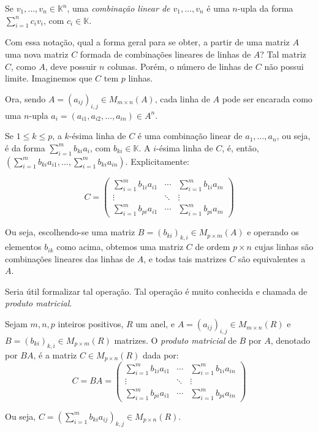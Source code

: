 \begin{definition}
    Se $v_1, \dots, v_n\in \mathbb K^n$, uma \emph{combinação linear de $v_1, \dots, v_n$} é uma $n$-upla da forma $\sum_{i=1}^n c_i v_i$, com $c_i\in \mathbb K$.
\end{definition}

Com essa notação, qual a forma geral para se obter, a partir de uma matriz $A$ uma nova matriz $C$ formada de combinações lineares de linhas de $A$?
Tal matriz $C$, como $A$, deve possuir $n$ colunas. Porém, o número de linhas de $C$ não possui limite. Imaginemos que $C$ tem $p$ linhas.

Ora, sendo $A=(a_{ij})_{i, j}\in M_{m \times n}(A)$, cada linha de $A$ pode ser encarada como uma $n$-upla $a_i=(a_{i1}, a_{i2}, \ldots, a_{in})\in A^n$.

Se $1\leq k \leq p$, a $k$-ésima linha de $C$ é uma combinação linear de $a_1, \dots, a_n$, ou seja, é da forma $\sum_{i=1}^m b_{ki} a_i$, com $b_{ki}\in \mathbb K$.
A $i$-ésima linha de $C$, é, então, $(\sum_{i=1}^m b_{ki} a_{i1}, \dots, \sum_{i=1}^m b_{ki} a_{in})$.
Explicitamente:

\begin{equation*}
    C = \begin{pmatrix}
        \sum_{i=1}^m b_{1i} a_{i1} & \cdots & \sum_{i=1}^m b_{1i} a_{in} \\
        \vdots & \ddots & \vdots \\
        \sum_{i=1}^m b_{pi} a_{i1} & \cdots & \sum_{i=1}^m b_{pi} a_{in}
    \end{pmatrix}
\end{equation*}

Ou seja, escolhendo-se uma matriz $B=(b_{ki})_{k,i}\in M_{p \times m}(A)$ e operando os elementos $b_{ik}$ como acima, obtemos uma matriz $C$ de ordem $p \times n$ cujas linhas são combinações lineares das linhas de $A$, e todas tais matrizes $C$ são equivalentes a $A$.

Seria útil formalizar tal operação.
Tal operação é muito conhecida e chamada de \emph{produto matricial}.

\begin{definition}
    Sejam $m, n, p$ inteiros positivos, $R$ um anel, e $A=(a_{ij})_{i, j}\in M_{m \times n}(R)$ e $B=(b_{ki})_{k, i}\in M_{p \times m}(R)$ matrizes.
    O \emph{produto matricial} de $B$ por $A$, denotado por $BA$, é a matriz $C\in M_{p \times n}(R)$ dada por:
    \begin{equation*}
        C = BA = \begin{pmatrix}
            \sum_{i=1}^m b_{1i} a_{i1} & \cdots & \sum_{i=1}^m b_{1i} a_{in} \\
            \vdots & \ddots & \vdots \\
            \sum_{i=1}^m b_{pi} a_{i1} & \cdots & \sum_{i=1}^m b_{pi} a_{in}
        \end{pmatrix}
    \end{equation*}

    Ou seja, $C=(\sum_{i=1}^m b_{ki} a_{ij})_{k, j}\in M_{p \times n}(R)$.
\end{definition}

